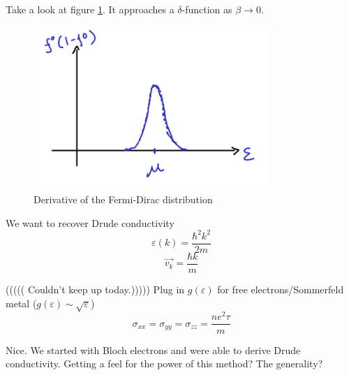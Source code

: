 \documentclass[a4paper]{article}
\newcommand{\hcut}{\hbar}
\begin{document}
Take a look at figure \ref{fig:figures-fddv-png}. It approaches
a  $\delta$-function as $\beta \to  0$.
\begin{figure}[h]
	\centering
	\includegraphics[width=0.8\textwidth]{figures/fddv.png}
	\caption{Derivative of the Fermi-Dirac distribution}
	\label{fig:figures-fddv-png}
\end{figure}


We want to recover Drude conductivity
\begin{equation}
	\varepsilon(k) = \frac{\hcut^2k^2}{2m}
\end{equation}
\begin{equation}
	\vec{v_k} = \frac{\hcut k}{m}
\end{equation}
%

((((( Couldn't keep up today.)))))
Plug in $g(\varepsilon)$ for free electrons/Sommerfeld metal ($g(\varepsilon) \sim \sqrt{\varepsilon} $)
\begin{equation}
	\sigma_{xx} = \sigma_{y y} = \sigma_{z z} = \frac{ne^2\tau}{m}
\end{equation}

Nice. We started with Bloch electrons and were able to derive Drude
conductivity. Getting a feel for the power of this method? The generality?
\end{document}
